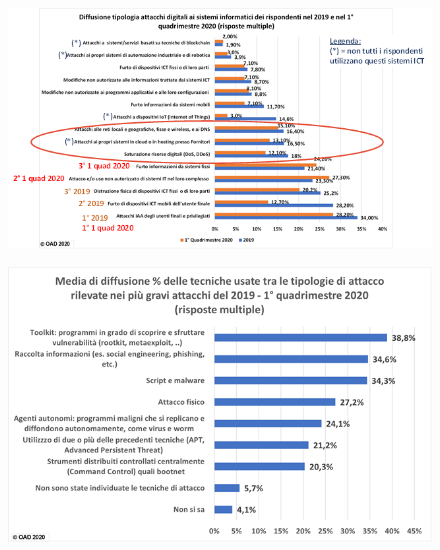\documentclass{easychair}
\begin{document}
\begin{figure}
	\centering
		\includegraphics[width=1\textwidth]{pictures/fig5.png}
		\caption{}
		\label{fig:5}
\end{figure}
\begin{figure}
	\centering
		\includegraphics[width=1\textwidth]{pictures/fig6.png}
		\caption{}
		\label{fig:6}
\end{figure}
\end{document}
